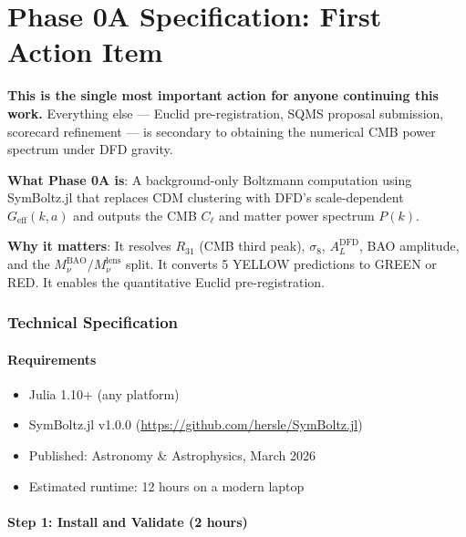 \documentclass[11pt,a4paper]{article}
\begin{document}
\part{Phase 0A Specification: First Action Item}
\label{part:phase0a}

\begin{tcolorbox}[colback=red!5!white, colframe=red!60!black,
  title={\textbf{FIRST THING TO DO}: Execute Phase 0A}]

\textbf{This is the single most important action for anyone continuing this work.} Everything else --- Euclid pre-registration, SQMS proposal submission, scorecard refinement --- is secondary to obtaining the numerical CMB power spectrum under DFD gravity.

\textbf{What Phase 0A is}: A background-only Boltzmann computation using SymBoltz.jl that replaces CDM clustering with DFD's scale-dependent $G_\text{eff}(k,a)$ and outputs the CMB $C_\ell$ and matter power spectrum $P(k)$.

\textbf{Why it matters}: It resolves $R_{31}$ (CMB third peak), $\sigma_8$, $A_L^\text{DFD}$, BAO amplitude, and the $M_\nu^\text{BAO}/M_\nu^\text{lens}$ split. It converts 5 YELLOW predictions to GREEN or RED. It enables the quantitative Euclid pre-registration.
\end{tcolorbox}

\section{Technical Specification}

\subsection{Requirements}

\begin{itemize}
\item Julia 1.10+ (any platform)
\item SymBoltz.jl v1.0.0 (\url{https://github.com/hersle/SymBoltz.jl})
\item Published: Astronomy \& Astrophysics, March 2026
\item Estimated runtime: 12 hours on a modern laptop
\end{itemize}

\subsection{Step 1: Install and Validate (2 hours)}
\end{document}
